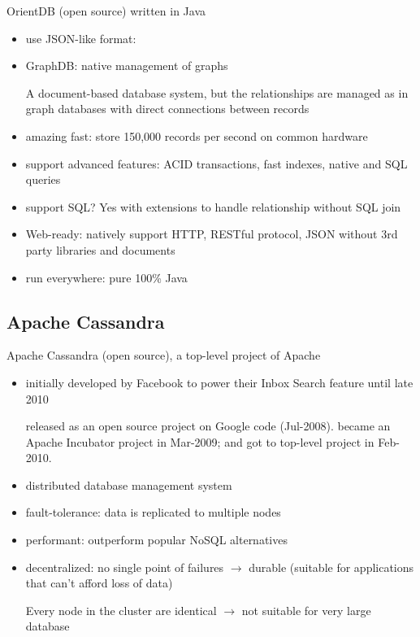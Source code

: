 OrientDB (open source) written in Java
\begin{itemize}
  \item use JSON-like format:
  
  \item GraphDB: native management of graphs 
   
  A document-based database system, but the relationships are managed as
  in graph databases with direct connections between records
  
  \item amazing fast: store 150,000 records per second on common hardware
  
  \item support advanced features: ACID transactions, fast indexes, native and
  SQL queries
  
  \item support SQL? Yes with extensions to handle relationship without SQL join
  
  \item Web-ready: natively support HTTP, RESTful protocol, JSON without 3rd
  party libraries and documents
  
  \item run everywhere: pure 100\% Java
\end{itemize}

\subsection{Apache Cassandra}

Apache Cassandra (open source), a top-level project of Apache
\begin{itemize}
  \item initially developed by Facebook to power their Inbox Search feature
  until late 2010
  
  released as an open source project on Google code (Jul-2008). became an Apache
  Incubator project in Mar-2009; and got to top-level project in Feb-2010.
  
  \item distributed database management system
  \item fault-tolerance: data is replicated to multiple nodes
  \item performant: outperform popular NoSQL alternatives
  \item decentralized: no single point of failures $\rightarrow$ durable
  (suitable for applications that can't afford loss of data)
  
  Every node in the cluster are identical $\rightarrow$ not suitable for very
  large database
\end{itemize}

